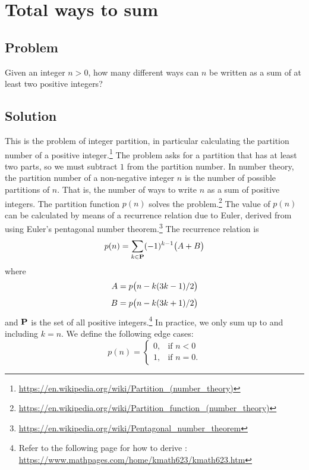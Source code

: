 
\section{Total ways to sum}



\subsection*{Problem}

Given an integer $n > 0$, how many different ways can $n$ be written
as a sum of at least two positive integers?



\subsection*{Solution}

This is the problem of integer partition, in particular calculating
the partition number of a positive integer.\footnote{
  \url{https://en.wikipedia.org/wiki/Partition_(number_theory)}
}
The problem asks for a partition that has at least two parts, so we
must subtract $1$ from the partition number.  In number theory, the
partition number of a non-negative integer $n$ is the number of
possible partitions of $n$.  That is, the number of ways to write $n$
as a sum of positive integers.  The partition function $p(n)$ solves
the problem.\footnote{
  \url{https://en.wikipedia.org/wiki/Partition_function_(number_theory)}
}
The value of $p(n)$ can be calculated by means of a recurrence
relation due to Euler, derived from using Euler's pentagonal number
theorem.\footnote{
  \url{https://en.wikipedia.org/wiki/Pentagonal_number_theorem}
}
The recurrence relation is
\begin{equation}
\label{eqn:sum:partition_function}
p(n)
=
\sum_{k \in \mathbf{P}} (-1)^{k-1} \big({A + B}\big)
\end{equation}
where
\begin{align*}
A &= p\big({n - k(3k - 1) / 2}\big) \\[4pt]
B &= p\big({n - k(3k + 1) / 2}\big)
\end{align*}
and $\mathbf{P}$ is the set of all positive integers.\footnote{
  Refer to the following page for how to derive
  :
  \url{https://www.mathpages.com/home/kmath623/kmath623.htm}
}
In practice, we only sum up to and including $k = n$.  We define the
following edge cases:
\[
p(n)
=
\begin{cases}
0, & \text{if $n < 0$} \\[4pt]
1, & \text{if $n = 0$}.
\end{cases}
\]
